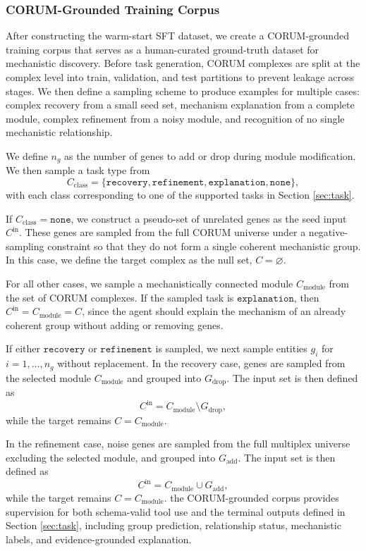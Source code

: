 \documentclass[thesis,letterpaper,12pt]{utthesis}
\begin{document}
\subsubsection{CORUM-Grounded Training Corpus}\label{sec:corum-corpus}
After constructing the warm-start SFT dataset, we create a CORUM-grounded training corpus that serves as a human-curated ground-truth dataset for mechanistic discovery. Before task generation, CORUM complexes are split at the complex level into train, validation, and test partitions to prevent leakage across stages. We then define a sampling scheme to produce examples for multiple cases: complex recovery from a small seed set, mechanism explanation from a complete module, complex refinement from a noisy module, and recognition of no single mechanistic relationship.

We define $n_g$ as the number of genes to add or drop during module modification. We then sample a task type from
\[
C_{\text{class}} = \{\texttt{recovery}, \texttt{refinement}, \texttt{explanation}, \texttt{none}\},
\]
with each class corresponding to one of the supported tasks in Section \ref{sec:task}.

If $C_{\text{class}} = \texttt{none}$, we construct a pseudo-set of unrelated genes as the seed input $C^{\text{in}}$. These genes are sampled from the full CORUM universe under a negative-sampling constraint so that they do not form a single coherent mechanistic group. In this case, we define the target complex as the null set, $C = \varnothing$.

For all other cases, we sample a mechanistically connected module $C_{\text{module}}$ from the set of CORUM complexes. If the sampled task is $\texttt{explanation}$, then $C^{\text{in}} = C_{\text{module}} = C$, since the agent should explain the mechanism of an already coherent group without adding or removing genes.

If either $\texttt{recovery}$ or $\texttt{refinement}$ is sampled, we next sample entities $g_i$ for $i = 1, \dots, n_g$ without replacement. In the recovery case, genes are sampled from the selected module $C_{\text{module}}$ and grouped into $G_{\text{drop}}$. The input set is then defined as
\[
C^{\text{in}} = C_{\text{module}} \setminus G_{\text{drop}},
\]
while the target remains $C = C_{\text{module}}$.

In the refinement case, noise genes are sampled from the full multiplex universe excluding the selected module, and grouped into $G_{\text{add}}$. The input set is then defined as
\[
C^{\text{in}} = C_{\text{module}} \cup G_{\text{add}},
\]
while the target remains $C = C_{\text{module}}$. the CORUM-grounded corpus provides supervision for both schema-valid tool use and the terminal outputs defined in Section \ref{sec:task}, including group prediction, relationship status, mechanistic labels, and evidence-grounded explanation.
\end{document}

